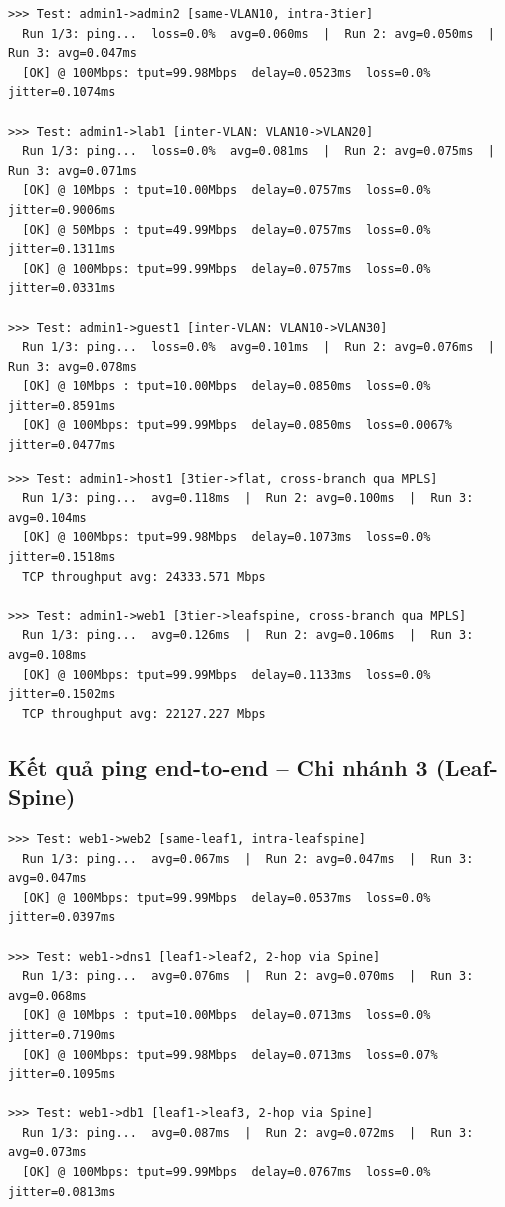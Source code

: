 \begin{lstlisting}[style=termstyle, caption={Ping intra-branch: admin1 $\to$ admin2 (same-VLAN), lab1, guest1 (inter-VLAN)}]
>>> Test: admin1->admin2 [same-VLAN10, intra-3tier]
  Run 1/3: ping...  loss=0.0%  avg=0.060ms  |  Run 2: avg=0.050ms  |  Run 3: avg=0.047ms
  [OK] @ 100Mbps: tput=99.98Mbps  delay=0.0523ms  loss=0.0%   jitter=0.1074ms

>>> Test: admin1->lab1 [inter-VLAN: VLAN10->VLAN20]
  Run 1/3: ping...  loss=0.0%  avg=0.081ms  |  Run 2: avg=0.075ms  |  Run 3: avg=0.071ms
  [OK] @ 10Mbps : tput=10.00Mbps  delay=0.0757ms  loss=0.0%  jitter=0.9006ms
  [OK] @ 50Mbps : tput=49.99Mbps  delay=0.0757ms  loss=0.0%  jitter=0.1311ms
  [OK] @ 100Mbps: tput=99.99Mbps  delay=0.0757ms  loss=0.0%  jitter=0.0331ms

>>> Test: admin1->guest1 [inter-VLAN: VLAN10->VLAN30]
  Run 1/3: ping...  loss=0.0%  avg=0.101ms  |  Run 2: avg=0.076ms  |  Run 3: avg=0.078ms
  [OK] @ 10Mbps : tput=10.00Mbps  delay=0.0850ms  loss=0.0%    jitter=0.8591ms
  [OK] @ 100Mbps: tput=99.99Mbps  delay=0.0850ms  loss=0.0067% jitter=0.0477ms
\end{lstlisting}

\begin{lstlisting}[style=termstyle, caption={Ping cross-branch: admin1 (3-Tier) $\to$ host1 (Flat) và web1 (Leaf-Spine)}]
>>> Test: admin1->host1 [3tier->flat, cross-branch qua MPLS]
  Run 1/3: ping...  avg=0.118ms  |  Run 2: avg=0.100ms  |  Run 3: avg=0.104ms
  [OK] @ 100Mbps: tput=99.98Mbps  delay=0.1073ms  loss=0.0%  jitter=0.1518ms
  TCP throughput avg: 24333.571 Mbps

>>> Test: admin1->web1 [3tier->leafspine, cross-branch qua MPLS]
  Run 1/3: ping...  avg=0.126ms  |  Run 2: avg=0.106ms  |  Run 3: avg=0.108ms
  [OK] @ 100Mbps: tput=99.99Mbps  delay=0.1133ms  loss=0.0%  jitter=0.1502ms
  TCP throughput avg: 22127.227 Mbps
\end{lstlisting}

\subsection{Kết quả ping end-to-end -- Chi nhánh 3 (Leaf-Spine)}

\begin{lstlisting}[style=termstyle, caption={Ping intra-branch: web1 $\to$ web2 (same-leaf), dns1, db1 (2-hop)}]
>>> Test: web1->web2 [same-leaf1, intra-leafspine]
  Run 1/3: ping...  avg=0.067ms  |  Run 2: avg=0.047ms  |  Run 3: avg=0.047ms
  [OK] @ 100Mbps: tput=99.99Mbps  delay=0.0537ms  loss=0.0%  jitter=0.0397ms

>>> Test: web1->dns1 [leaf1->leaf2, 2-hop via Spine]
  Run 1/3: ping...  avg=0.076ms  |  Run 2: avg=0.070ms  |  Run 3: avg=0.068ms
  [OK] @ 10Mbps : tput=10.00Mbps  delay=0.0713ms  loss=0.0%   jitter=0.7190ms
  [OK] @ 100Mbps: tput=99.98Mbps  delay=0.0713ms  loss=0.07%  jitter=0.1095ms

>>> Test: web1->db1 [leaf1->leaf3, 2-hop via Spine]
  Run 1/3: ping...  avg=0.087ms  |  Run 2: avg=0.072ms  |  Run 3: avg=0.073ms
  [OK] @ 100Mbps: tput=99.99Mbps  delay=0.0767ms  loss=0.0%  jitter=0.0813ms
\end{lstlisting}

